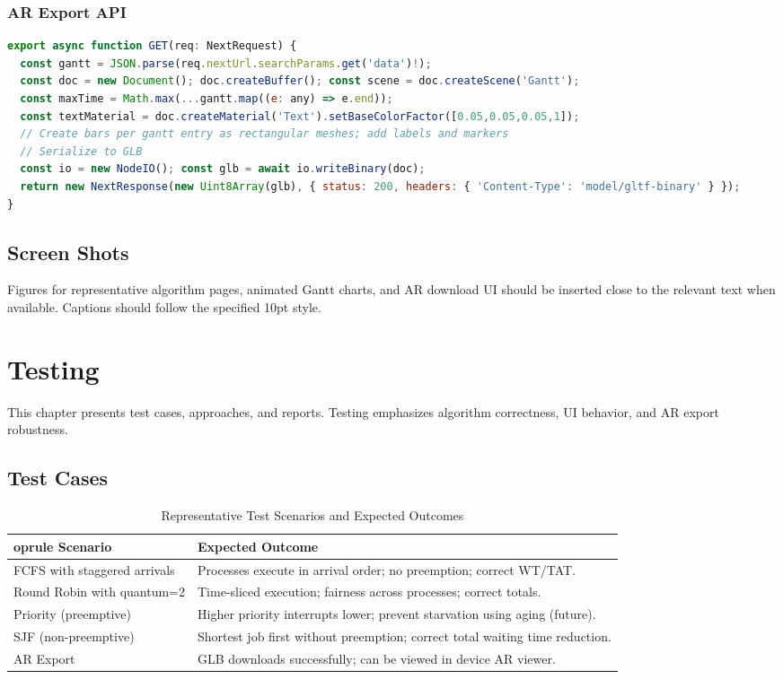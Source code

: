 \documentclass[12pt,a4paper,oneside]{report}
\begin{document}
\subsection*{AR Export API}
\begin{lstlisting}[language=JavaScript, caption={API route generating GLB from Gantt data (excerpt from \texttt{src/app/api/gantt-model/route.ts}).}]
export async function GET(req: NextRequest) {
  const gantt = JSON.parse(req.nextUrl.searchParams.get('data')!);
  const doc = new Document(); doc.createBuffer(); const scene = doc.createScene('Gantt');
  const maxTime = Math.max(...gantt.map((e: any) => e.end));
  const textMaterial = doc.createMaterial('Text').setBaseColorFactor([0.05,0.05,0.05,1]);
  // Create bars per gantt entry as rectangular meshes; add labels and markers
  // Serialize to GLB
  const io = new NodeIO(); const glb = await io.writeBinary(doc);
  return new NextResponse(new Uint8Array(glb), { status: 200, headers: { 'Content-Type': 'model/gltf-binary' } });
}
\end{lstlisting}

\section{Screen Shots}
Figures for representative algorithm pages, animated Gantt charts, and AR download UI should be inserted close to the relevant text when available. Captions should follow the specified 10pt style.

\chapter{Testing}
\noindent This chapter presents test cases, approaches, and reports. Testing emphasizes algorithm correctness, UI behavior, and AR export robustness.

\section{Test Cases}
\begin{longtable}{p{} p{}}
\caption{Representative Test Scenarios and Expected Outcomes}\\
	oprule
Scenario & Expected Outcome \\
\midrule
FCFS with staggered arrivals & Processes execute in arrival order; no preemption; correct WT/TAT. \\
Round Robin with quantum=2 & Time-sliced execution; fairness across processes; correct totals. \\
Priority (preemptive) & Higher priority interrupts lower; prevent starvation using aging (future). \\
SJF (non-preemptive) & Shortest job first without preemption; correct total waiting time reduction. \\
AR Export & GLB downloads successfully; can be viewed in device AR viewer. \\
\bottomrule
\end{longtable}
\end{document}
